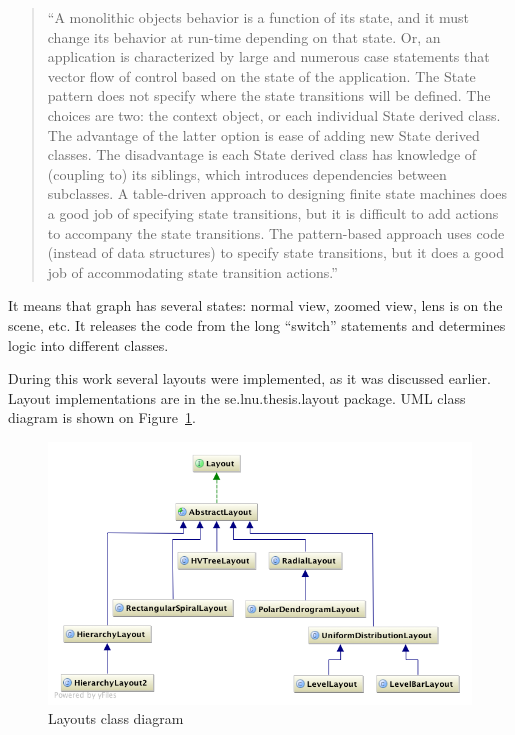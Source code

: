 \begin{quotation}
``A monolithic objects behavior is a function of its state, and it must change its behavior at run-time depending on that state.
Or, an application is characterized by large and numerous case statements that vector flow of control based on the state
of the application. The State pattern does not specify where the state transitions will be defined. The choices are two:
the context object, or each individual State derived class.
The advantage of the latter option is ease of adding new State derived classes.
The disadvantage is each State derived class has knowledge of (coupling to) its siblings,
which introduces dependencies between subclasses.
A table-driven approach to designing finite state machines does a good job of specifying state transitions,
but it is difficult to add actions to accompany the state transitions. The pattern-based approach uses code
(instead of data structures) to specify state transitions,
but it does a good job of accommodating state transition actions.''~\cite{STATE}
\end{quotation}

It means that graph has several states: normal view, zoomed view, lens is on the scene, etc.
It releases the code from the long ``switch'' statements  and determines logic into different classes.

\newpage
During this work several layouts were implemented, as it was discussed earlier.
Layout implementations are in the \textsf{se.lnu.thesis.layout} package. UML class diagram is shown on Figure~\ref{fig:uml_layouts}.

\begin{figure}[h!]
\centering
\includegraphics[scale=0.5]{pictures/uml_layouts.png}
\caption{Layouts class diagram}
\label{fig:uml_layouts}
\end{figure}
